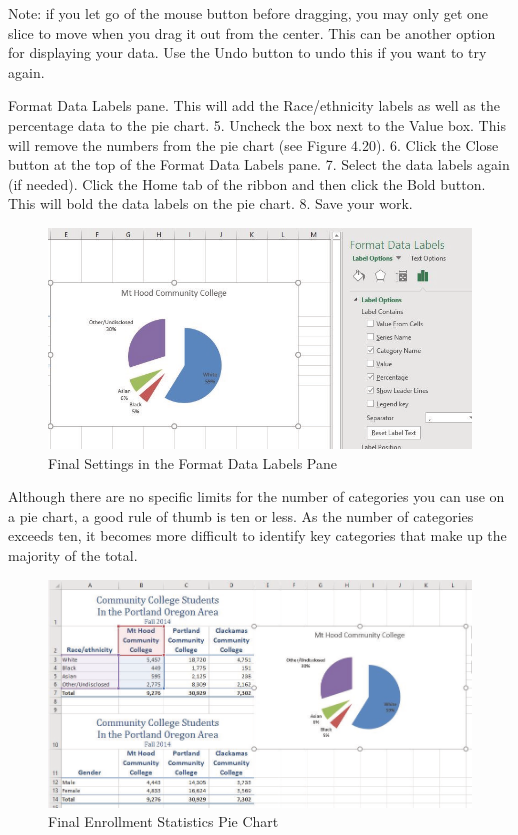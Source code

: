 Note: if you let go of the mouse button before dragging, you may only get one slice to move when you
drag it out from the center. This can be another option for displaying your data. Use the Undo button to
undo this if you want to try again.





Format Data Labels pane. This will add the Race/ethnicity labels as well as the percentage data
to the pie chart.
5.   Uncheck the box next to the Value box. This will remove the numbers from the pie chart (see
Figure 4.20).
6.   Click the Close button at the top of the Format Data Labels pane.
7.   Select the data labels again (if needed). Click the Home tab of the ribbon and then click the Bold
button. This will bold the data labels on the pie chart.
8.   Save your work.


\begin{figure}[H]
	\centering
	\includegraphics[width=\maxwidth{.95\linewidth}]{gfx/ch04_fig21}
	\caption{Final Settings in the Format Data Labels Pane}
	\label{04:fig21}
\end{figure}





Although there are no specific limits for the number of categories you can use on a pie chart, a good
rule of thumb is ten or less. As the number of categories exceeds ten, it becomes more difficult to
identify key categories that make up the majority of the total.



\begin{figure}[H]
	\centering
	\includegraphics[width=\maxwidth{.95\linewidth}]{gfx/ch04_fig22}
	\caption{Final Enrollment Statistics Pie Chart}
	\label{04:fig22}
\end{figure}





